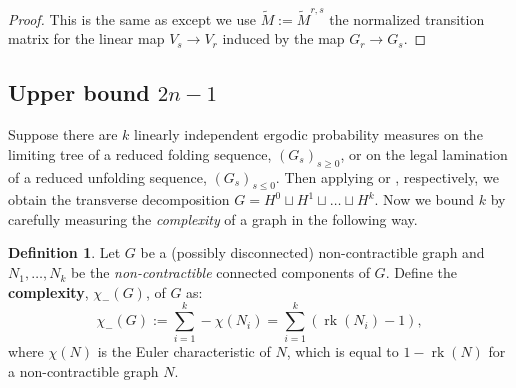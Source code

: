 \documentclass[11pt, letterpaper]{amsart}
\theoremstyle{plain}
\theoremstyle{definition}
\newtheorem{definition}[theorem]{Definition}
\DeclareMathOperator{\rk}{rk}
\newcommand{\wt}[1]{\widetilde{#1}}
\begin{document}
\begin{proof}
  This is the same as  except we use 
  $\wt{M}:=\wt{M}^{r,s}$ the normalized transition matrix for the linear map
  $V_s \to V_r$ induced by
  the map $G_r \to G_s$.
\end{proof}


  \subsection{Upper bound $2n-1$}
  \label{ssec:upperbound_proof}

Suppose there are $k$ linearly independent ergodic probability measures on the
limiting tree of a reduced folding sequence, $(G_s)_{s\geq 0}$, or on the legal lamination of a reduced unfolding sequence, $(G_s)_{s\leq 0}$.
Then applying  or
, respectively, we obtain the transverse
decomposition $G=H^0\sqcup H^1 \sqcup \ldots \sqcup H^k$.
Now we bound $k$ by carefully measuring the \emph{complexity} of a graph in the following way.

\begin{definition}\label{def:complexity}
Let $G$ be a (possibly disconnected) non-contractible graph and $N_1,\ldots,N_k$
be the \textit{non-contractible} connected components of $G$. Define the
\textbf{complexity}, $\chi_-(G)$, of $G$ as:
\[
    \chi_-(G) := \sum_{i=1}^k -\chi(N_i)=
\sum_{i=1}^k \left(\rk(N_i)-1\right),
\]
where $\chi(N)$ is the Euler characteristic of $N$, which is equal to $1-\rk(N)$
for a non-contractible graph $N$.
\end{definition}
  
\end{document}
